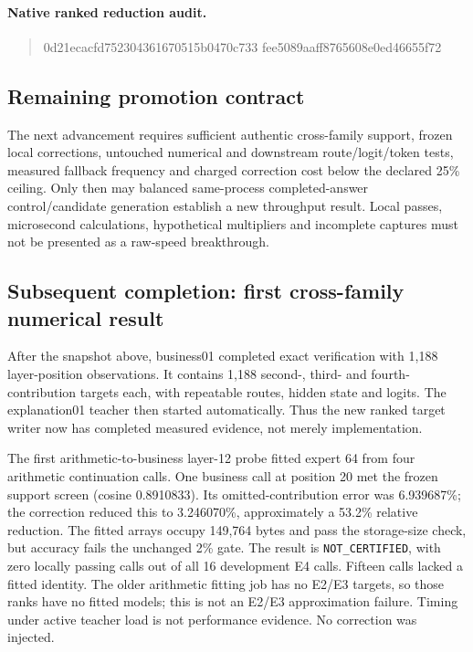 \paragraph{Native ranked reduction audit.}
\begin{quote}\ttfamily\small
0d21ecacfd752304361670515b0470c733\allowbreak
fee5089aaff8765608e0ed46655f72
\end{quote}

\subsection{Remaining promotion contract}
The next advancement requires sufficient authentic cross-family support,
frozen local corrections, untouched numerical and downstream route/logit/token
tests, measured fallback frequency and charged correction cost below the
declared 25\% ceiling. Only then may balanced same-process completed-answer
control/candidate generation establish a new throughput result. Local passes,
microsecond calculations, hypothetical multipliers and incomplete captures
must not be presented as a raw-speed breakthrough.

\subsection{Subsequent completion: first cross-family numerical result}
After the snapshot above, business01 completed exact verification with 1,188
layer-position observations. It contains 1,188 second-, third- and fourth-
contribution targets each, with repeatable routes, hidden state and logits.
The explanation01 teacher then started automatically. Thus the new ranked
target writer now has completed measured evidence, not merely implementation.

The first arithmetic-to-business layer-12 probe fitted expert 64 from four
arithmetic continuation calls. One business call at position 20 met the frozen
support screen (cosine 0.8910833). Its omitted-contribution error was
6.939687\%; the correction reduced this to 3.246070\%, approximately a 53.2\%
relative reduction. The fitted arrays occupy 149,764 bytes and pass the
storage-size check, but accuracy fails the unchanged 2\% gate. The result is
\texttt{NOT\_CERTIFIED}, with zero locally passing calls out of all 16
development E4 calls. Fifteen calls lacked a fitted identity. The older
arithmetic fitting job has no E2/E3 targets, so those ranks have no fitted
models; this is not an E2/E3 approximation failure. Timing under active teacher
load is not performance evidence. No correction was injected.


